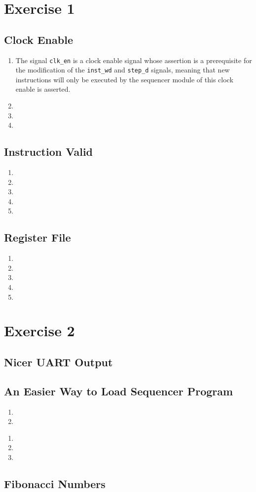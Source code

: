 \documentclass[]{article}
\begin{document}
\section{Exercise 1}


\subsection{Clock Enable}
\begin{enumerate}
\item The signal \texttt{clk\_en} is a clock enable signal whose assertion is a prerequisite for the modification of the \texttt{inst\_wd} and \texttt{step\_d} signals, meaning that new instructions will only be executed by the sequencer module of this clock enable is asserted.
\item 
\item 
\item 
\end{enumerate}
\subsection{Instruction Valid}
\begin{enumerate}
\item 
\item 
\item 
\item 
\item 
\end{enumerate}
\subsection{Register File}
\begin{enumerate}
\item 
\item 
\item 
\item 
\item 
\end{enumerate}

\section{Exercise 2}


\subsection{Nicer UART Output}
\subsection{An Easier Way to Load Sequencer Program}

\begin{enumerate}
\item 
\item
\end{enumerate}

\begin{enumerate}
\item 
\item
\item
\end{enumerate}

\subsection{Fibonacci Numbers}
\end{document}
